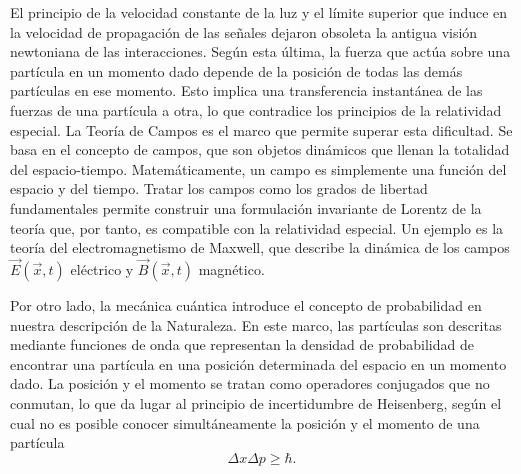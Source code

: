 El principio de la velocidad constante de la luz y el límite superior que induce en la velocidad de propagación de las señales dejaron obsoleta la antigua visión newtoniana de las interacciones. Según esta última, la fuerza que actúa sobre una partícula en un momento dado depende de la posición de todas las demás partículas en ese momento. Esto implica una transferencia instantánea de las fuerzas de una partícula a otra, lo que contradice los principios de la relatividad especial. La Teoría de Campos es el marco que permite superar esta dificultad. Se basa en el concepto de campos, que son objetos dinámicos que llenan la totalidad del espacio-tiempo. Matemáticamente, un campo es simplemente una función del espacio y del tiempo. Tratar los campos como los grados de libertad fundamentales permite construir una formulación invariante de Lorentz de la teoría que, por tanto, es compatible con la relatividad especial. Un ejemplo es la teoría del electromagnetismo de Maxwell, que describe la dinámica de los campos $\vec{E}(\vec{x},t)$ eléctrico y $\vec{B}(\vec{x},t)$ magnético.

Por otro lado, la mecánica cuántica introduce el concepto de probabilidad en nuestra descripción de la Naturaleza. En este marco, las partículas son descritas mediante funciones de onda que representan la densidad de probabilidad de encontrar una partícula en una posición determinada del espacio en un momento dado. La posición y el momento se tratan como operadores conjugados que no conmutan, lo que da lugar al principio de incertidumbre de Heisenberg, según el cual no es posible conocer simultáneamente la posición y el momento de una partícula
\begin{equation*}
\Delta x\Delta p\geq\hbar.
\end{equation*} 

